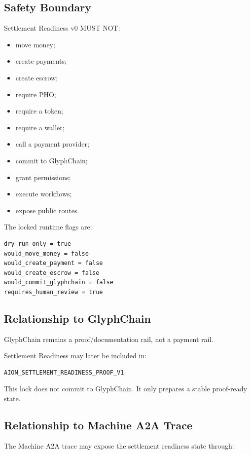 \subsection{Safety Boundary}

Settlement Readiness v0 MUST NOT:

\begin{itemize}
  \item move money;
  \item create payments;
  \item create escrow;
  \item require PHO;
  \item require a token;
  \item require a wallet;
  \item call a payment provider;
  \item commit to GlyphChain;
  \item grant permissions;
  \item execute workflows;
  \item expose public routes.
\end{itemize}

The locked runtime flags are:

\begin{verbatim}
dry_run_only = true
would_move_money = false
would_create_payment = false
would_create_escrow = false
would_commit_glyphchain = false
requires_human_review = true
\end{verbatim}

\subsection{Relationship to GlyphChain}

GlyphChain remains a proof/documentation rail, not a payment rail.

Settlement Readiness may later be included in:

\begin{verbatim}
AION_SETTLEMENT_READINESS_PROOF_V1
\end{verbatim}

This lock does not commit to GlyphChain. It only prepares a stable proof-ready state.

\subsection{Relationship to Machine A2A Trace}

The Machine A2A trace may expose the settlement readiness state through:

